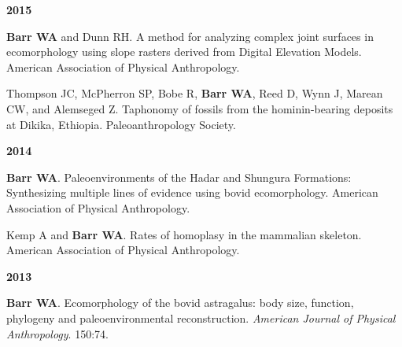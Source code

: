 \documentclass{article}
\begin{document}
\begin{description*}
\begin{minipage}{\linewidth}
\item[] {\bfseries 2015}
\item[] {\bfseries Barr WA} and Dunn RH. A method for analyzing complex joint surfaces in ecomorphology using slope rasters derived from Digital Elevation Models. American Association of Physical Anthropology.
\item[] Thompson JC, McPherron SP, Bobe R, {\bfseries Barr WA}, Reed D, Wynn J, Marean CW, and Alemseged Z. Taphonomy of fossils from the hominin-bearing deposits at Dikika, Ethiopia. Paleoanthropology Society.
\end{minipage}
\end{description*}



\begin{description*}
\begin{minipage}{\linewidth}
\item[] {\bfseries 2014}
\item[] {\bfseries Barr WA}. Paleoenvironments of the Hadar and Shungura Formations: Synthesizing multiple lines of evidence using bovid ecomorphology. American Association of Physical Anthropology.
\item[] Kemp A and {\bfseries Barr WA}. Rates of homoplasy in the mammalian skeleton. American Association of Physical Anthropology.
\end{minipage}
\end{description*}



\begin{description*}
\begin{minipage}{\linewidth}
\item[] {\bfseries 2013}
\item[] {\bfseries Barr WA}. Ecomorphology of the bovid astragalus: body size, function, phylogeny and paleoenvironmental reconstruction. \emph{American Journal of Physical Anthropology}. 150:74.
\end{minipage}
\end{description*}
\end{document}
